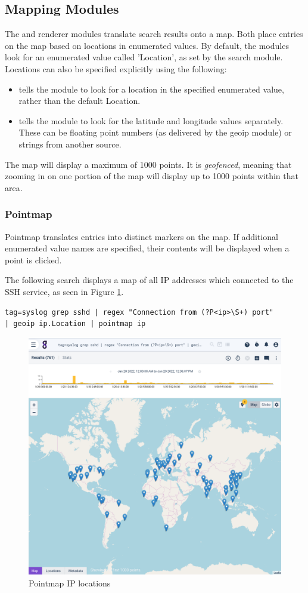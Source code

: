 \subsection{Mapping Modules}

The  and  renderer modules translate search results onto
a map. Both place entries on the map based on locations in enumerated
values. By default, the modules look for an enumerated value called
'Location', as set by the  search module. Locations can also be
specified explicitly using the following:

\begin{itemize}
\item
   tells the module to
  look for a location in the specified enumerated value, rather than the
  default Location.
\item
   tells the module to look
  for the latitude and longitude values separately. These can be
  floating point numbers (as delivered by the geoip module) or strings
  from another source.
\end{itemize}

The map will display a maximum of 1000 points. It is \emph{geofenced}, meaning
that zooming in on one portion of the map will display up to 1000 points
within that area.

\subsubsection{Pointmap}

Pointmap translates entries into distinct markers on the map. If
additional enumerated value names are specified, their contents will be
displayed when a point is clicked.

The following search displays a map of all IP addresses which connected to the SSH service, as seen in Figure \ref{fig:pointmap-ip}.

\begin{Verbatim}[breaklines=true]
tag=syslog grep sshd | regex "Connection from (?P<ip>\S+) port"
| geoip ip.Location | pointmap ip
\end{Verbatim}

\begin{figure}
	\includegraphics[width=0.6\linewidth]{images/pointmap-ip.png}
	\caption{Pointmap IP locations}
	\label{fig:pointmap-ip}
\end{figure}

